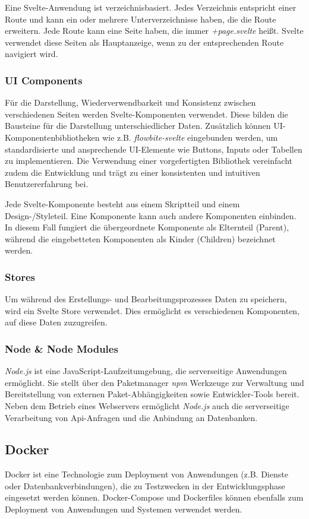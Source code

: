 Eine Svelte-Anwendung ist verzeichnisbasiert. Jedes Verzeichnis entspricht einer Route und kann ein oder mehrere Unterverzeichnisse haben, die die Route erweitern. Jede Route kann eine Seite haben, die immer \textit{+page.svelte} heißt. Svelte verwendet diese Seiten als Hauptanzeige, wenn zu der entsprechenden Route navigiert wird.

\subsubsection{UI Components}

Für die Darstellung, Wiederverwendbarkeit und Konsistenz zwischen verschiedenen Seiten werden Svelte-Komponenten verwendet. Diese bilden die Bausteine für die Darstellung unterschiedlicher Daten. Zusätzlich können UI-Komponentenbibliotheken wie z.B. \textit{flowbite-svelte} eingebunden werden, um standardisierte und ansprechende UI-Elemente wie Buttons, Inputs oder Tabellen zu implementieren. Die Verwendung einer vorgefertigten Bibliothek vereinfacht zudem die Entwicklung und trägt zu einer konsistenten und intuitiven Benutzererfahrung bei.

Jede Svelte-Komponente besteht aus einem Skriptteil und einem Design-/Styleteil. Eine Komponente kann auch andere Komponenten einbinden. In diesem Fall fungiert die übergeordnete Komponente als Elternteil (Parent), während die eingebetteten Komponenten als Kinder (Children) bezeichnet werden.

\subsubsection{Stores}

Um während des Erstellungs- und Bearbeitungsprozesses Daten zu speichern, wird ein Svelte Store verwendet. Dies ermöglicht es verschiedenen Komponenten, auf diese Daten zuzugreifen.

\subsubsection{Node \& Node Modules}

\textit{Node.js} ist eine JavaScript-Laufzeitumgebung, die serverseitige Anwendungen ermöglicht. Sie stellt über den Paketmanager \textit{npm} Werkzeuge zur Verwaltung und Bereitstellung von externen Paket-Abhängigkeiten sowie Entwickler-Tools bereit. Neben dem Betrieb eines Webservers ermöglicht \textit{Node.js} auch die serverseitige Verarbeitung von Api-Anfragen und die Anbindung an Datenbanken.

\subsection{Docker} \label{cha:grundlagen:swtech:docker}

Docker ist eine Technologie zum Deployment von Anwendungen (z.B. Dienste oder Datenbankverbindungen), die zu Testzwecken in der Entwicklungsphase eingesetzt werden können. Docker-Compose und Dockerfiles können ebenfalls zum Deployment von Anwendungen und Systemen verwendet werden.